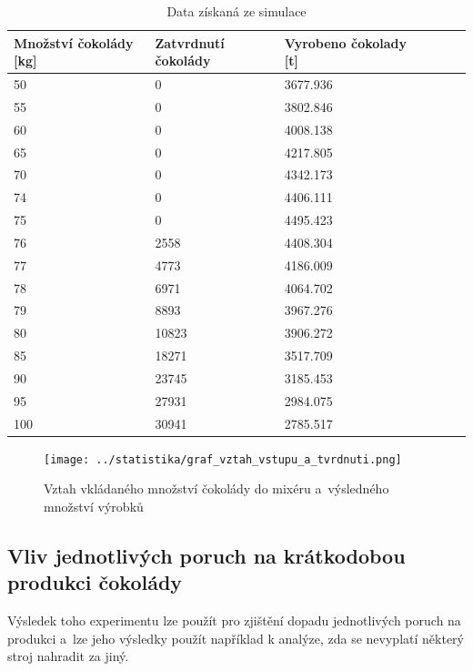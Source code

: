 \documentclass[11pt,a4paper,titlepage]{article}
\begin{document}
			\begin{table}[htb]
				\centering
				\begin{tabular}{|l|l|l|l|l|l|l|}
				\hline
				Množství čokolády [kg]  & Zatvrdnutí čokolády & Vyrobeno čokolady [t] \\ \hline
				50                 & 0                   & 3677.936 \\
				55                 & 0                   & 3802.846 \\
				60                 & 0                   & 4008.138 \\
				65                 & 0                   & 4217.805 \\
				70                 & 0                   & 4342.173 \\
				74                 & 0                   & 4406.111 \\
				75                 & 0                   & 4495.423 \\
				76                 & 2558                & 4408.304 \\
				77                 & 4773                & 4186.009 \\
				78                 & 6971                & 4064.702 \\
				79                 & 8893                & 3967.276 \\
				80                 & 10823               & 3906.272 \\
				85                 & 18271               & 3517.709 \\
				90                 & 23745               & 3185.453 \\
				95                 & 27931               & 2984.075 \\
				100                & 30941               & 2785.517 \\ \hline
				\end{tabular}
				\caption{ Data získaná ze simulace }
				\label{table:experiment_1}
			\end{table}

			\begin{figure}[H]
			\begin{center}
				\texttt{[image: ../statistika/graf\_vztah\_vstupu\_a\_tvrdnuti.png]}
				\caption{ Vztah vkládaného množství čokolády do mixéru a~výsledného množství výrobků }
				\label{fig:graf_tvrdnuti}
			\end{center}
			\end{figure}

		\subsection{Vliv jednotlivých poruch na krátkodobou produkci čokolády}
			Výsledek toho experimentu lze použít pro zjištění dopadu jednotlivých poruch
			na produkci a~lze jeho výsledky použít například k analýze, zda se nevyplatí
			některý stroj nahradit za jiný.
\end{document}
